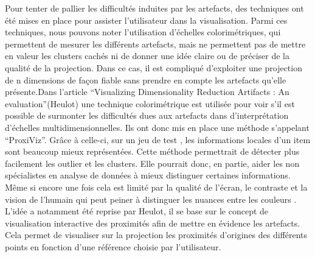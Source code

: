 \smallskip
Pour tenter de pallier les difficultés induites par les artefacts, des techniques ont été mises en place pour assister l’utilisateur dans la visualisation. Parmi ces techniques, nous pouvons noter l’utilisation d’échelles colorimétriques\cite{CheckViz}, qui permettent de mesurer les différents artefacts, mais ne permettent pas de mettre en valeur les clusters cachés ni de donner une idée claire ou de préciser de la qualité de la projection. 
Dans ce cas, il est compliqué d’exploiter une projection de n dimensions de façon fiable sans prendre en compte les artefacts qu’elle présente\cite{aupetit2007visualizing}.Dans l’article “Visualizing Dimensionality Reduction Artifacts : An evaluation”(Heulot) 
une technique colorimétrique est utilisée pour voir s’il est possible de surmonter les difficultés dues aux artefacts dans d’interprétation d’échelles multidimensionnelles. Ils ont donc mis en place une méthode s'appelant “ProxiViz”. Grâce à celle-ci, sur un jeu de test , les informations locales d’un item sont beaucoup mieux représentées. Cette méthode permettrait de détecter plus facilement les outlier et les clusters. 
Elle pourrait donc, en partie, aider les non spécialistes en analyse de données à mieux distinguer certaines informations. Même si encore une fois cela est limité par la qualité de l’écran, le contraste et la vision de l'humain qui peut peiner à distinguer les nuances entre les couleurs\cite{HeulotAnEvaluation} \cite{tran2021approaching} \cite{deering1998human_vision}.
L’idée a notamment été reprise par Heulot\cite{HeulotThese}, il se base sur le concept de visualisation interactive des proximités afin de mettre en évidence les artefacts. Cela permet de visualiser sur la projection les proximités d’origines des différents points en fonction d’une référence choisie par l’utilisateur.


\medskip











